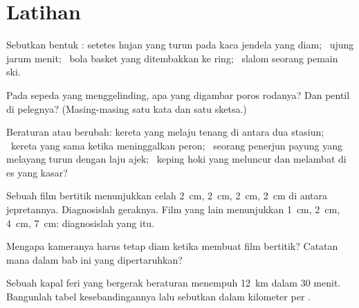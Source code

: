 \section{Latihan}

\begin{exercise}[$\star$]\label{exo:g6:describing-motion:1}
Sebutkan bentuk : setetes hujan yang turun pada kaca
jendela yang diam; \ ujung jarum menit; \ bola basket yang ditembakkan
ke ring; \ slalom seorang pemain ski.
\end{exercise}

\begin{exercise}[$\star$]\label{exo:g6:describing-motion:2}
Pada sepeda yang menggelinding,  apa yang digambar poros
rodanya? Dan pentil di pelegnya? (Masing-masing satu kata dan satu
sketsa.)
\end{exercise}

\begin{exercise}[$\star$]\label{exo:g6:describing-motion:3}
Beraturan atau berubah: kereta yang melaju tenang di antara dua
stasiun; \ kereta yang sama ketika meninggalkan peron; \ seorang
penerjun payung yang melayang turun dengan laju ajek; \ keping hoki
yang meluncur dan melambat di es yang kasar?
\end{exercise}

\begin{exercise}[$\star$]\label{exo:g6:describing-motion:4}
Sebuah film bertitik menunjukkan celah \qty{2}{cm}, \qty{2}{cm},
\qty{2}{cm}, \qty{2}{cm} di antara jepretannya. Diagnosislah geraknya.
Film yang lain menunjukkan \qty{1}{cm}, \qty{2}{cm}, \qty{4}{cm},
\qty{7}{cm}: diagnosislah yang itu.
\end{exercise}

\begin{exercise}[$\star$]\label{exo:g6:describing-motion:5}
Mengapa kameranya harus tetap diam ketika membuat film bertitik?
Catatan mana dalam bab ini yang dipertaruhkan?
\end{exercise}

\begin{exercise}[$\star$]\label{exo:g6:describing-motion:6}
Sebuah kapal feri yang bergerak beraturan menempuh \qty{12}{km} dalam
$30$ menit. Bangunlah tabel kesebandingannya lalu sebutkan
 dalam kilometer per .
\end{exercise}

